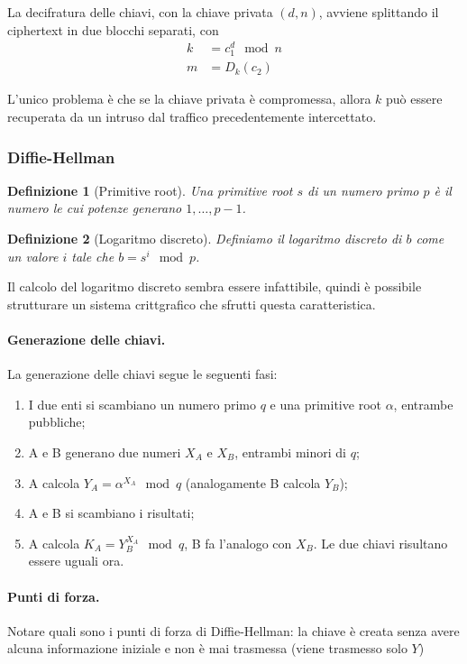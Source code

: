 \documentclass[a4paper, 10pt, twoside]{article}
\newtheorem{definit}{Definizione}[subsection]
\begin{document}
	La decifratura delle chiavi, con la chiave privata $(d,n)$, avviene splittando il ciphertext in due blocchi separati, con \begin{align*}
		k &= c^d_1 \mod n \\
		m &= D_k(c_2)
	\end{align*}
	
	L'unico problema è che se la chiave privata è compromessa, allora $k$ può essere recuperata da un intruso dal traffico precedentemente intercettato.
	
	\subsubsection{Diffie-Hellman}
	\begin{definit}[Primitive root]
		Una primitive root $s$ di un numero primo $p$ è il numero le cui potenze generano $1,\dots,p-1$.
	\end{definit}

	\begin{definit}[Logaritmo discreto]
		Definiamo il logaritmo discreto di $b$ come un valore $i$ tale che $b=s^i \mod p$.
	\end{definit}
	
	Il calcolo del logaritmo discreto sembra essere infattibile, quindi è possibile strutturare un sistema crittgrafico che sfrutti questa caratteristica.
	
	\paragraph{Generazione delle chiavi.} La generazione delle chiavi segue le seguenti fasi: \begin{enumerate}
		\item I due enti si scambiano un numero primo $q$ e una primitive root $\alpha$, entrambe pubbliche;
		\item A e B generano due numeri $X_A$ e $X_B$, entrambi minori di $q$;
		\item A calcola $Y_A = \alpha^{X_A} \mod q$ (analogamente B calcola $Y_B$);
		\item A e B si scambiano i risultati;
		\item A calcola $K_A = Y_B^{X_A} \mod q$, B fa l'analogo con $X_B$. Le due chiavi risultano essere uguali ora.
	\end{enumerate}

	\paragraph{Punti di forza.} Notare quali sono i punti di forza di Diffie-Hellman: la chiave è creata senza avere alcuna informazione iniziale e non è mai trasmessa (viene trasmesso solo $Y$)
	
\end{document}
